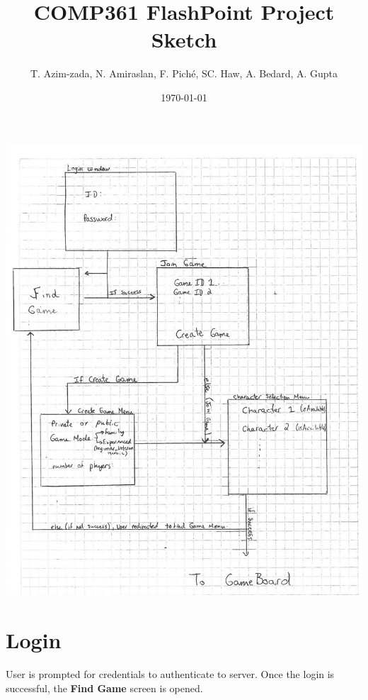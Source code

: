 \documentclass[12pt]{article}
\theoremstyle{definition}
\begin{document}
\title{COMP361 FlashPoint Project Sketch}
\author{T. Azim-zada, N. Amiraslan, F. Pich\'e, SC. Haw, A. Bedard, A. Gupta}
\date{\today}
\maketitle
\newpage
\tableofcontents
\newpage

\includegraphics[scale=0.5]{LoginFindGame}
\part{Login}
User is prompted for credentials to authenticate to server. Once the login is successful, the \textbf{Find Game} screen is opened.
\end{document}
